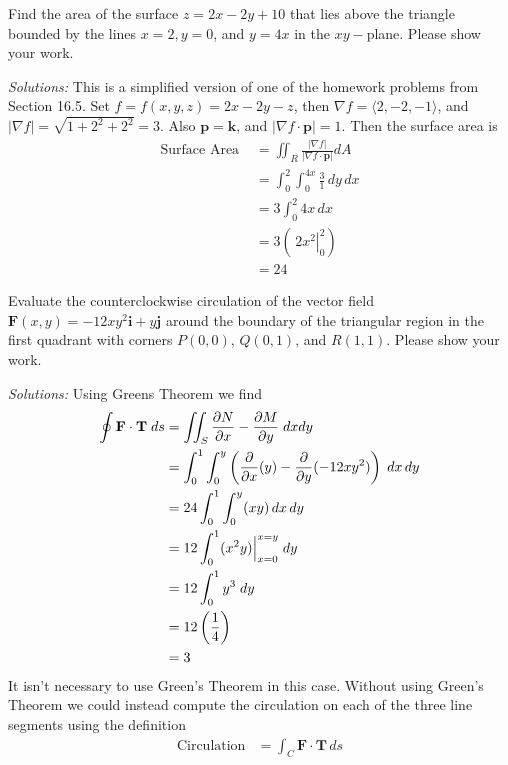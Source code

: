 \ifnum {}
    \question[4] Find the area of the surface $z = 2x -2y + 10$ that lies above the triangle bounded by the lines $x = 2, y = 0$, and $y = 4x$ in the $xy-$plane. Please show your work. 
    
    \ifnum {} {\color{DarkBlue}  \textit{Solutions:} 
    This is a simplified version of one of the homework problems from Section 16.5. Set $f = f(x,y,z) = 2x - 2y -z$, then $\nabla f = \langle 2,-2,-1\rangle$, and $|\nabla f| = \sqrt{1+2^2+2^2} = 3$. Also $\mathbf p = \mathbf k$, and $|\nabla f \cdot \mathbf p| = 1$. Then the surface area is
    \begin{align}
        \text{Surface Area } &= \iint_R \frac{|\nabla f|}{|\nabla f \cdot \mathbf p| }dA \\
        &= \int_0^2 \int_0^{4x} \frac{3}{1} \, dy\,dx \\
        &= 3 \int_0^2 4x \,dx \\
        &= 3 \left(\, \left. 2x^2 \right|_0^2 \right) \\
        &= 24
    \end{align}
    } 
   \else
   \fi
\fi





\ifnum {}

    \question[4]  Evaluate the counterclockwise circulation of the vector field $\mathbf F (x,y) = -12xy^2\mathbf i + y \mathbf j$ around the boundary of the triangular region in the first quadrant with corners $P(0,0)$, $Q(0,1)$, and $R(1,1)$.  Please show your work. 
    
    \ifnum {} {\color{DarkBlue}  \textit{Solutions:} 
    Using Greens Theorem we find
    \begin{align*}
        \oint \mathbf F \cdot \mathbf{T} \;ds 
        &= \iint_S  \frac{\partial N}{ \partial x} - \frac{\partial M}{\partial y} \;dx dy 
        \\ 
        &= \int_0^1\int_{0}^{y}  \left( \frac{\partial}{\partial x} (y) - \frac{\partial}{\partial y}(-12xy^2) \right) \;dx \, dy 
        \\ 
        &= 24 \int_0^1 \int_{0}^{y} ( xy ) \, dx\, dy \\ 
        &= 12 \int_0^1 ( x^2y )\Big\vert_{x=0}^{x=y} \;dy \\ 
        &= 12 \int_0^1 y^3 \;dy \\ 
        &= 12 \left( \frac14 \right) \\
        &= 3
    \end{align*}
    It isn't necessary to use Green's Theorem in this case. Without using Green's Theorem we could instead compute the circulation on each of the three line segments using the definition
    \begin{align}
        \text{Circulation} &= \int_C \mathbf F \cdot \mathbf T \, ds
    \end{align}
    } 
   \else
      
